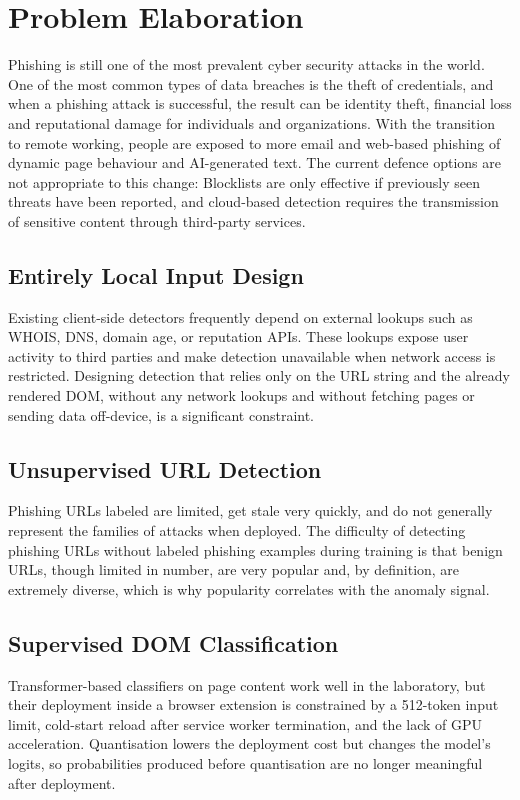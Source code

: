 \documentclass{FastFyp}
\begin{document}
\section{Problem Elaboration}
\label{sec:problem-elaboration}
Phishing is still one of the most prevalent cyber security attacks in the world. One of the most common types of data breaches is the theft of credentials, and when a phishing attack is successful, the result can be identity theft, financial loss and reputational damage for individuals and organizations. With the transition to remote working, people are exposed to more email and web-based phishing of dynamic page behaviour and AI-generated text. The current defence options are not appropriate to this change: Blocklists are only effective if previously seen threats have been reported, and cloud-based detection requires the transmission of sensitive content through third-party services.

\subsection{Entirely Local Input Design}
Existing client-side detectors frequently depend on external lookups such as WHOIS, DNS, domain age, or reputation APIs. These lookups expose user activity to third parties and make detection unavailable when network access is restricted. Designing detection that relies only on the URL string and the already rendered DOM, without any network lookups and without fetching pages or sending data off-device, is a significant constraint.

\subsection{Unsupervised URL Detection}
Phishing URLs labeled are limited, get stale very quickly, and do not generally represent the families of attacks when deployed. The difficulty of detecting phishing URLs without labeled phishing examples during training is that benign URLs, though limited in number, are very popular and, by definition, are extremely diverse, which is why popularity correlates with the anomaly signal.

\subsection{Supervised DOM Classification}
Transformer-based classifiers on page content work well in the laboratory, but their deployment inside a browser extension is constrained by a 512-token input limit, cold-start reload after service worker termination, and the lack of GPU acceleration. Quantisation lowers the deployment cost but changes the model's logits, so probabilities produced before quantisation are no longer meaningful after deployment.
\end{document}
